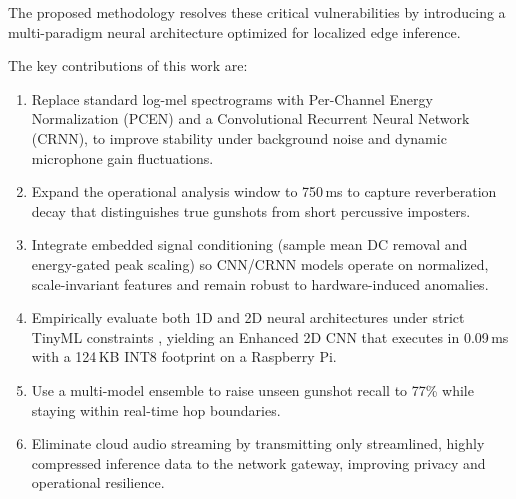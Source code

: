 \documentclass[conference]{IEEEtran}
\begin{document}


The proposed methodology resolves these critical vulnerabilities by introducing a multi-paradigm neural architecture optimized for localized edge inference.

The key contributions of this work are:
\begin{enumerate}
    \item Replace standard log-mel spectrograms with Per-Channel Energy Normalization (PCEN) and a Convolutional Recurrent Neural Network (CRNN), to improve stability under background noise and dynamic microphone gain fluctuations.
    \item Expand the operational analysis window to 750\,ms to capture reverberation decay that distinguishes true gunshots from short percussive imposters.
    \item Integrate embedded signal conditioning (sample mean DC removal and energy-gated peak scaling) so CNN/CRNN models operate on normalized, scale-invariant features and remain robust to hardware-induced anomalies.
    \item Empirically evaluate both 1D and 2D neural architectures under strict TinyML constraints \cite{banbury2021}, yielding an Enhanced 2D CNN that executes in 0.09\,ms with a 124\,KB INT8 footprint on a Raspberry Pi.
    \item Use a multi-model ensemble to raise unseen gunshot recall to 77\% while staying  within real-time hop boundaries.
    \item Eliminate cloud audio streaming by transmitting only streamlined, highly compressed inference data to the network gateway, improving privacy and operational resilience.
\end{enumerate}
\end{document}
